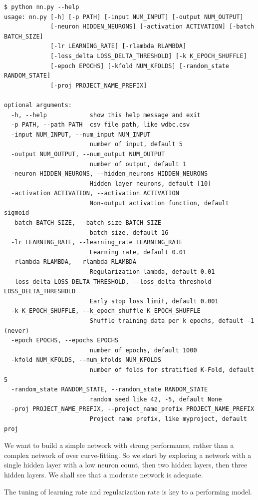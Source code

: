 \begin{verbatim}
$ python nn.py --help
usage: nn.py [-h] [-p PATH] [-input NUM_INPUT] [-output NUM_OUTPUT]
             [-neuron HIDDEN_NEURONS] [-activation ACTIVATION] [-batch BATCH_SIZE]
             [-lr LEARNING_RATE] [-rlambda RLAMBDA]
             [-loss_delta LOSS_DELTA_THRESHOLD] [-k K_EPOCH_SHUFFLE]
             [-epoch EPOCHS] [-kfold NUM_KFOLDS] [-random_state RANDOM_STATE]
             [-proj PROJECT_NAME_PREFIX]

optional arguments:
  -h, --help            show this help message and exit
  -p PATH, --path PATH  csv file path, like wdbc.csv
  -input NUM_INPUT, --num_input NUM_INPUT
                        number of input, default 5
  -output NUM_OUTPUT, --num_output NUM_OUTPUT
                        number of output, default 1
  -neuron HIDDEN_NEURONS, --hidden_neurons HIDDEN_NEURONS
                        Hidden layer neurons, default [10]
  -activation ACTIVATION, --activation ACTIVATION
                        Non-output activation function, default sigmoid
  -batch BATCH_SIZE, --batch_size BATCH_SIZE
                        batch size, default 16
  -lr LEARNING_RATE, --learning_rate LEARNING_RATE
                        Learning rate, default 0.01
  -rlambda RLAMBDA, --rlambda RLAMBDA
                        Regularization lambda, default 0.01
  -loss_delta LOSS_DELTA_THRESHOLD, --loss_delta_threshold LOSS_DELTA_THRESHOLD
                        Early stop loss limit, default 0.001
  -k K_EPOCH_SHUFFLE, --k_epoch_shuffle K_EPOCH_SHUFFLE
                        Shuffle training data per k epochs, default -1 (never)
  -epoch EPOCHS, --epochs EPOCHS
                        number of epochs, default 1000
  -kfold NUM_KFOLDS, --num_kfolds NUM_KFOLDS
                        number of folds for stratified K-Fold, default 5
  -random_state RANDOM_STATE, --random_state RANDOM_STATE
                        random seed like 42, -5, default None
  -proj PROJECT_NAME_PREFIX, --project_name_prefix PROJECT_NAME_PREFIX
                        Project name prefix, like myproject, default proj
\end{verbatim}

We want to build a simple network with strong performance, rather than a complex network of over curve-fitting. So we start by exploring a network with a single hidden layer with a low neuron count, then two hidden layers, then three hidden layers. We shall see that a moderate network is adequate. 

The tuning of learning rate and regularization rate is key to a performing model.  


